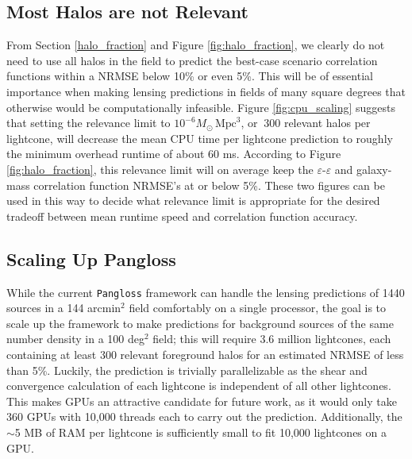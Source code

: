 \documentclass[%
 reprint,
 amsmath,amssymb,
 aps,nofootinbib
]{revtex4-1}
\begin{document}
\subsection{Most Halos are not Relevant}

From Section \ref{halo_fraction} and Figure \ref{fig:halo_fraction}, we clearly do not need to use all halos in the field to predict the best-case scenario correlation functions within a NRMSE below 10\% or even 5\%. This will be of essential importance when making lensing predictions in fields of many square degrees that otherwise would be computationally infeasible. Figure \ref{fig:cpu_scaling} suggests that setting the relevance limit to ${10^{-6}M_\odot\,\text{Mpc}^3}$, or $~300$ relevant halos per lightcone, will decrease the mean CPU time per lightcone prediction to roughly the minimum overhead runtime of about 60 ms. According to Figure \ref{fig:halo_fraction}, this relevance limit will on average keep the $\varepsilon$-$\varepsilon$ and galaxy-mass correlation function NRMSE's at or below 5\%. These two figures can be used in this way to decide what relevance limit is appropriate for the desired tradeoff between mean runtime speed and correlation function accuracy. 


\subsection{Scaling Up Pangloss} \label{scaling_up}

While the current \texttt{Pangloss} framework can handle the lensing predictions of 1440 sources in a 144 arcmin$^2$ field comfortably on a single processor, the goal is to scale up the framework to make predictions for background sources of the same number density in a 100 deg$^2$ field; this will require 3.6 million lightcones, each containing at least 300 relevant foreground halos for an estimated NRMSE of less than 5\%. Luckily, the prediction is trivially parallelizable as the shear and convergence calculation of each lightcone is independent of all other lightcones. This makes GPUs an attractive candidate for future work, as it would only take 360 GPUs with 10,000 threads each to carry out the prediction. Additionally, the $\sim$5 MB of RAM per lightcone is sufficiently small to fit 10,000 lightcones on a GPU.
\end{document}
